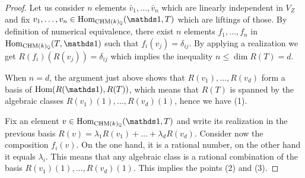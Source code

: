 \begin{proof}
Let us consider $n$ elements $\bar{v}_1,\ldots,\bar{v}_n$ which are linearly independent in $V_Z$ and fix $v_1,\ldots,v_n\in \Hom_{\CHM(k)_\Q}(\one,T)$ which are liftings of those. By definition of numerical equivalence, there exist  $n$ elements   $f_1,\ldots,f_n $  in $\Hom_{\CHM(k)_\Q}( T,\one)$ such that $f_i(v_j)=\delta_{ij}$. By applying a realization we get $R(f_i)(R(v_j))=\delta_{ij}$ which implies the inequality ${n \leq \dim R(T)=d.}$


When $n=d$, the argument just above shows that $R(v_1),\ldots,R(v_d)$ form a basis of $\Hom(R(\one),R(T))$, which means that $R(T)$ is spanned by the  algebraic classes $R(v_1)(1),\ldots,R(v_d)(1)$, hence we have (1).

Fix  an element $v\in \Hom_{\CHM(k)_\Q}(\one,T)$ and write its realization in the previous basis $R(v)= \lambda_1 R(v_1)+ \ldots + \lambda_d R(v_d)$. Consider now the composition $f_i(v)$. On the one hand, it is a rational number, on the other hand it equals $\lambda_i$. This means that any algebraic class is a rational combination of the basis $R(v_1)(1),\ldots,R(v_d)(1)$. This implies the points (2) and (3).
\end{proof}
